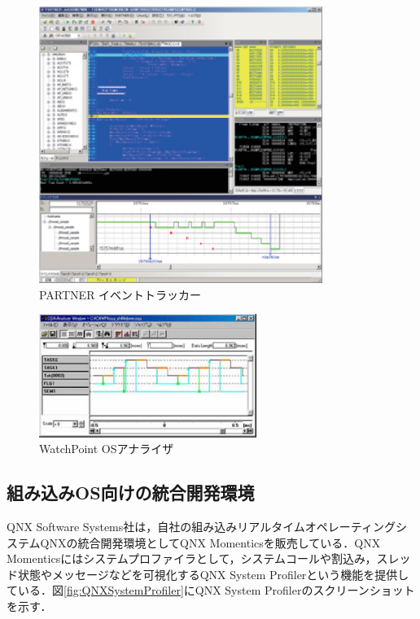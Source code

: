 \begin{figure}[p]
\begin{center}
\includegraphics[height=9cm]{img/PARTNER-JET.eps}
\caption{PARTNER イベントトラッカー}
\label{fig:PARTNER-JET}
\end{center}
\end{figure}

\begin{figure}[p]
\begin{center}
\includegraphics[height=4cm]{img/watchpoint.eps}
\caption{WatchPoint OSアナライザ}
\label{fig:watchpoint}
\end{center}
\end{figure}

\subsection{組み込みOS向けの統合開発環境}

QNX Software Systems社は，自社の組み込みリアルタイムオペレーティングシステムQNXの統合開発環境としてQNX Momenticsを販売している．QNX Momenticsにはシステムプロファイラとして，システムコールや割込み，スレッド状態やメッセージなどを可視化するQNX System Profiler\cite{QNXMomentics}という機能を提供している．図\ref{fig:QNXSystemProfiler}にQNX System Profilerのスクリーンショットを示す．

